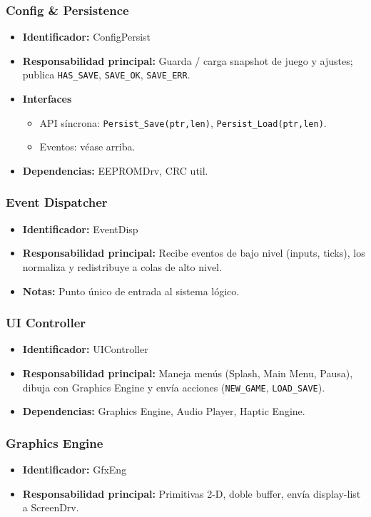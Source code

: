 \documentclass[11pt,a4paper]{article}
\begin{document}
\subsubsection{Config \& Persistence}
\begin{itemize}
  \item \textbf{Identificador:} ConfigPersist
  \item \textbf{Responsabilidad principal:} Guarda / carga snapshot de juego y ajustes; publica \texttt{HAS\_SAVE}, \texttt{SAVE\_OK}, \texttt{SAVE\_ERR}.
  \item \textbf{Interfaces} 
    \begin{itemize}
      \item API síncrona: \texttt{Persist\_Save(ptr,len)}, \texttt{Persist\_Load(ptr,len)}.
      \item Eventos: véase arriba.
    \end{itemize}
  \item \textbf{Dependencias:} EEPROMDrv, CRC util.
\end{itemize}

\subsubsection{Event Dispatcher}
\begin{itemize}
  \item \textbf{Identificador:} EventDisp
  \item \textbf{Responsabilidad principal:} Recibe eventos de bajo nivel (inputs, ticks), los normaliza y redistribuye a colas de alto nivel.
  \item \textbf{Notas:} Punto único de entrada al sistema lógico.
\end{itemize}

\subsubsection{UI Controller}
\begin{itemize}
  \item \textbf{Identificador:} UIController
  \item \textbf{Responsabilidad principal:} Maneja menús (Splash, Main Menu, Pausa), dibuja con Graphics Engine y envía acciones (\texttt{NEW\_GAME}, \texttt{LOAD\_SAVE}).
  \item \textbf{Dependencias:} Graphics Engine, Audio Player, Haptic Engine.
\end{itemize}

\subsubsection{Graphics Engine}
\begin{itemize}
  \item \textbf{Identificador:} GfxEng
  \item \textbf{Responsabilidad principal:} Primitivas 2-D, doble buffer, envía display-list a ScreenDrv.
\end{itemize}
\end{document}
